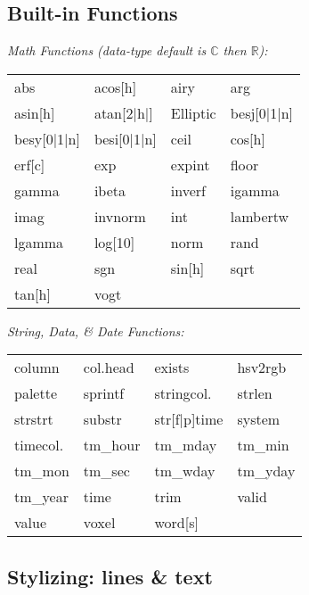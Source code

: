 \subsection*{Built-in Functions}

\textit{Math Functions (data-type default is $\mathbb{C}$ then $\mathbb{R}$):}\\
{\footnotesize
\begin{tabular}{l l l l}
    abs         & acos[h]       & airy      & arg       \\
    asin[h]     & atan[2|h|]    & Elliptic  & besj[0|1|n]       \\
    besy[0|1|n] & besi[0|1|n]   & ceil      & cos[h]    \\
    erf[c]      & exp           & expint    & floor     \\
    gamma       & ibeta         & inverf    & igamma    \\
    imag        & invnorm       & int       & lambertw  \\
    lgamma      & log[10]       & norm      & rand      \\
    real        & sgn           & sin[h]    & sqrt      \\
    tan[h]      & vogt
\end{tabular}}\vspace{2mm}

\textit{String, Data, \& Date Functions:}\\
{\footnotesize
\begin{tabular}{l l l l}
    column          & col.head      & exists        & hsv2rgb       \\
    palette         & sprintf       & stringcol.    & strlen        \\
    strstrt         & substr        & str[f|p]time  & system        \\
    timecol.        & tm\_hour      & tm\_mday      & tm\_min       \\
    tm\_mon         & tm\_sec       & tm\_wday      & tm\_yday      \\
    tm\_year        & time          & trim          & valid         \\
    value           & voxel         & word[s]       \\
\end{tabular}}


\subsection*{Stylizing: lines \& text}


